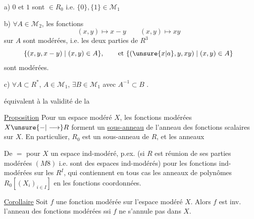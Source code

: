 
a) $0$ et $1$ sont $\in R_0$ i.e. $\{0\},\{1\}\in\mathcal M_1$

b) $\forall A\in\mathcal M_2$, les fonctions
\[
 (x,y)\longmapsto x-y\qquad
 (x,y)\longmapsto xy
\]
sur $A$ sont modérées,  i.e. les deux parties de $R^3$
\[
 \{(x,y,x-y)\mid(x,y)\in A\},\qquad\text{et }\{(\unsure{x|a},y,xy)\mid(x,y)\in A\}
\]
sont modérées.

c) $\forall A\subset R^*$, $A\in\mathcal M_1$, $\exists B\in\mathcal M_1$ avec $A^{-1}\subset B$ .

   équivalent à la validité de la


\uline{Proposition} Pour un espace modéré $X$, les fonctions modérées $X\unsure{-|\longrightarrow}R$  forment un \uline{sous-anneau} de l'anneau des fonctions scalaires sur $X$. En particulier, $R_0$ est un sous-anneau de $R$, et les anneaux

De $=$ pour $X$ un espace ind-modéré, p.ex. (si $R$ est réunion de ses parties modérées $(M8)$ i.e.  sont des espaces ind-modérés) pour les fonctions ind-modérées sur les $R^I$, qui contiennent en tous cas les  anneaux de polynômes $R_0[(X_i)_{i\in I}]$ en les fonctions coordonnées.


\uline{Corollaire} Soit $f$ une fonction modérée sur l'espace modéré $X$. Alors $f$ est inv.  l'anneau des fonctions modérées ssi $f$ ne s'annule pas dans $X$.

